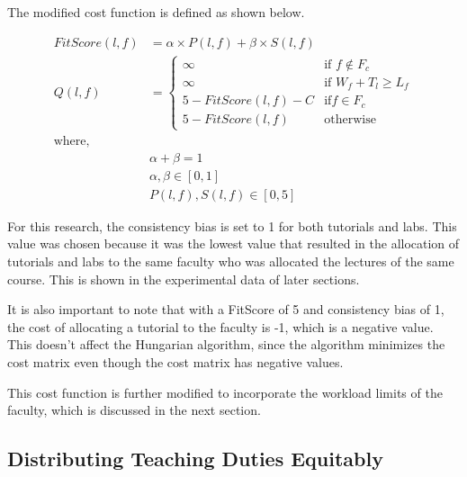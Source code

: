 The modified cost function is defined as shown below.

\begin{equation*}
  \begin{aligned}
    FitScore(l, f) & = \alpha \times P(l, f) + \beta \times S(l, f)          \\
    Q(l, f)        & = \begin{cases}
                         \infty                 & \text{if } f \notin F_c      \\
                         \infty                 & \text{if } W_f + T_l \ge L_f \\
                         5 - FitScore(l, f) - C & \text{if} f \in F_c          \\
                         5 - FitScore(l, f)     & \text{otherwise}
                       \end{cases} \\
    \text{where, } &                                                         \\
                   & \alpha + \beta = 1                                      \\
                   & \alpha, \beta \in [0, 1]                                \\
                   & P(l, f), S(l, f) \in [0, 5]
  \end{aligned}
\end{equation*}

For this research, the consistency bias is set to 1 for both tutorials and labs. This value was chosen because it was the lowest value that resulted in the allocation of tutorials and labs to the same faculty who was allocated the lectures of the same course. This is shown in the experimental data of later sections.

It is also important to note that with a FitScore of 5 and consistency bias of 1, the cost of allocating a tutorial to the faculty is -1, which is a negative value. This doesn't affect the Hungarian algorithm, since the algorithm minimizes the cost matrix even though the cost matrix has negative values.

This cost function is further modified to incorporate the workload limits of the faculty, which is discussed in the next section.

\subsection{Distributing Teaching Duties Equitably}
\label{sec:workload_limits}

